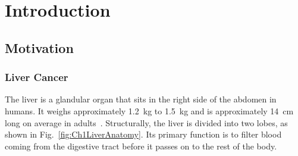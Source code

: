 \chapter{Introduction}

\section{Motivation}

\subsection{Liver Cancer}
The liver is a glandular organ that sits in the right side of the abdomen in humans. It weighs approximately 1.2~kg to 1.5~kg and is approximately 14~cm long on average in adults~\cite{Wolf1990,Kratzer2003}. Structurally, the liver is divided into two lobes, as shown in Fig.~\ref{fig:Ch1LiverAnatomy}. Its primary function is to filter blood coming from the digestive tract before it passes on to the rest of the body. 

